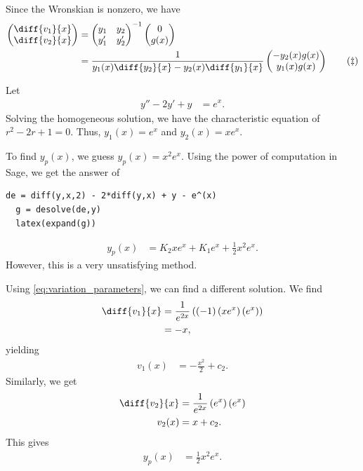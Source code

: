 \documentclass[10pt]{mypackage}
\begin{document}
Since the Wronskian is nonzero, we have
\begin{align*}
  \begin{pmatrix}\diff{v_1}{x} \\ \diff{v_2}{x}\end{pmatrix} &= \begin{pmatrix}y_1 & y_2\\y_1' & y_2'\end{pmatrix}^{-1} \begin{pmatrix}0\\g(x)\end{pmatrix}\\
                                                 &= \frac{1}{y_1(x)\diff{y_2}{x} - y_2(x)\diff{y_1}{x}} \begin{pmatrix}-y_2(x)g(x) \\ y_1(x)g(x)\end{pmatrix}\label{eq:variation_parameters}\tag{\textdaggerdbl}
\end{align*}
\begin{example}
  Let
  \begin{align*}
    y'' - 2y' + y &= e^x.
  \end{align*}
  Solving the homogeneous solution, we have the characteristic equation of $r^2 - 2r + 1 = 0$. Thus, $y_1(x) = e^x$ and $y_2(x) = xe^x$.\newline

  To find $y_p(x)$, we guess $y_p(x) = x^2 e^x$. Using the power of computation in Sage, we get the answer of
  \begin{lstlisting}[style=pythonstyle,title=Avoiding Variation of Parameters]
  de = diff(y,x,2) - 2*diff(y,x) + y - e^(x)
  g = desolve(de,y)
  latex(expand(g))
  \end{lstlisting}
  
  \begin{align*}
    y_p(x) &= K_{2} x e^{x}+ K_{1} e^{x} + \frac{1}{2} x^{2} e^{x}.
  \end{align*}
  However, this is a very unsatisfying method.\newline

  Using \eqref{eq:variation_parameters}, we can find a different solution. We find
  \begin{align*}
    \diff{v_1}{x} &= \frac{1}{e^{2x}}\left( \left( -1 \right)\left( xe^{x} \right)\left( e^x \right) \right)\\
            &= -x,
  \end{align*}
  yielding
  \begin{align*}
    v_1(x) &= -\frac{x^2}{2} + c_2.
  \end{align*}
  Similarly, we get
  \begin{align*}
    \diff{v_2}{x} &= \frac{1}{e^{2x}}\left( e^x \right)\left( e^x \right)\\
    v_2(x) &= x + c_2.
  \end{align*}
  This gives
  \begin{align*}
    y_p(x) &= \frac{1}{2}x^2e^x.
  \end{align*}
\end{example}
\end{document}

